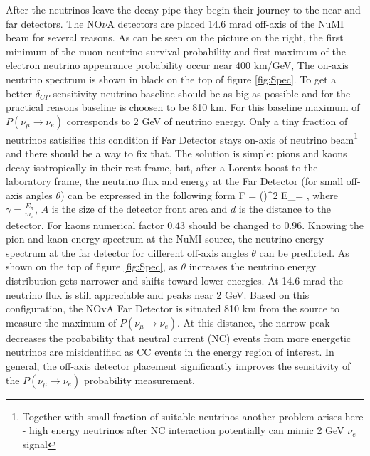 After the neutrinos leave the decay pipe they begin their journey to the near and far detectors.
The NO$\nu$A detectors are placed 14.6 mrad off-axis of the NuMI beam for several reasons. As can
be seen on the picture on the right, the first minimum of the muon neutrino survival
probability and first maximum of the electron neutrino appearance probability occur near 400 km/GeV,
The on-axis neutrino spectrum is shown in black on the top of figure \ref{fig:Spec}. To get a better 
$\delta_{CP}$ sensitivity neutrino baseline should be as big as possible and for the practical reasons
baseline is choosen to be 810 km. For this baseline maximum of $P(\nu_\mu \rightarrow \nu_e)$ corresponds
to 2 GeV of neutrino energy. Only a tiny fraction of neutrinos satisifies this condition if Far Detector 
stays on-axis of neutrino beam\footnote{Together with small fraction of suitable neutrinos another problem 
arises here - high energy neutrinos after NC interaction potentially can mimic 2 GeV $\nu_e$ signal} and 
there should be a way to fix that. The solution is simple: pions and kaons decay isotropically in their 
rest frame, but, after a Lorentz boost to the laboratory frame, the neutrino flux and energy at the Far 
Detector (for small off-axis angles $\theta$) can be expressed in the following form
\be
F = \Big(\Big)^2
\ee
\be
E_\nu = ,\label{EnuvsEpi}
\ee
where $\gamma = \frac{E_\pi}{m_\pi}$, $A$ is the size of the detector front area and $d$ is 
the distance to the detector. For kaons numerical factor $0.43$ should be changed to $0.96$. 
Knowing the pion and kaon energy spectrum at the NuMI source, the neutrino energy spectrum at
the far detector for different off-axis angles $\theta$ can be predicted. As shown on the top of
figure \ref{fig:Spec}, as $\theta$ increases the neutrino energy distribution gets narrower and shifts
toward lower energies. At 14.6 mrad the neutrino flux is still appreciable and peaks near 2 GeV.
Based on this configuration, the NOvA Far Detector is situated 810 km from the source to measure
the maximum of $P(\nu_\mu \rightarrow \nu_e)$. At this distance, the narrow peak decreases the
probability that neutral current (NC) events from more energetic neutrinos are misidentified
as CC events in the energy region of interest. In general, the off-axis detector placement
significantly improves the sensitivity of the $P(\nu_\mu \rightarrow \nu_e)$ probability measurement.
